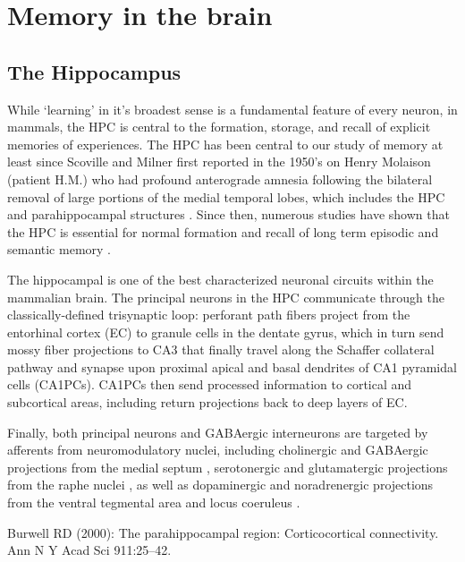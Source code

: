 \section{Memory in the brain}\label{sec:intro:memory:structure}

\subsection{The Hippocampus}\label{sec:intro:memory:hpc}
While `learning' in it's broadest sense is a fundamental feature of every neuron, in mammals, the \ac{HPC} is central to the formation, storage, and recall of explicit memories of experiences.
The \ac{HPC} has been central to our study of memory at least since Scoville and Milner first reported in the 1950's on Henry Molaison (patient H.M.) who had profound anterograde amnesia following the bilateral removal of large portions of the medial temporal lobes, which includes the \ac{HPC} and parahippocampal structures \citep{Scoville1957}.
Since then, numerous studies have shown that the \ac{HPC} is essential for normal formation and recall of long term episodic and semantic memory \citep[reviewd in][]{Eichenbaum2000, Burgess2002}.

The hippocampal is one of the best characterized neuronal circuits within the mammalian brain.
The principal neurons in the \ac{HPC} communicate through the classically-defined trisynaptic loop: perforant path fibers project from the entorhinal cortex (EC) to granule cells in the dentate gyrus, which in turn send mossy fiber projections to CA3 that finally travel along the Schaffer collateral pathway and synapse upon proximal apical and basal dendrites of CA1 pyramidal cells (CA1PCs).
CA1PCs then send processed information to cortical and subcortical areas, including return projections back to deep layers of EC.

Finally, both principal neurons and GABAergic interneurons are targeted by afferents from neuromodulatory nuclei, including cholinergic and GABAergic projections from the medial septum  \citep{Klausberger2008}, serotonergic and glutamatergic projections from the raphe nuclei \citep{Varga2009}, as well as dopaminergic and noradrenergic projections from the ventral tegmental area \citep{Gasbarri1997} and locus coeruleus \citep{Foote1983}.


Burwell RD (2000): The parahippocampal region: Corticocortical connectivity. Ann N Y Acad Sci 911:25–42.
